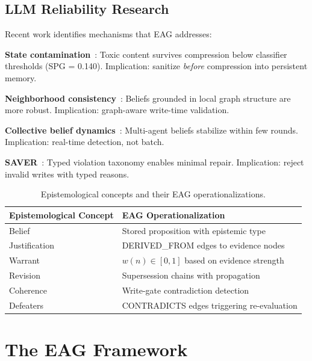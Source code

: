 \documentclass[11pt,a4paper]{article}
\begin{document}
\subsection{LLM Reliability Research}

Recent work identifies mechanisms that EAG addresses:

\textbf{State contamination}~\cite{wang2026contamination}: Toxic content survives compression below classifier thresholds (SPG = 0.140). Implication: sanitize \textit{before} compression into persistent memory.

\textbf{Neighborhood consistency}~\cite{xu2026ncb}: Beliefs grounded in local graph structure are more robust. Implication: graph-aware write-time validation.

\textbf{Collective belief dynamics}~\cite{he2026collective}: Multi-agent beliefs stabilize within few rounds. Implication: real-time detection, not batch.

\textbf{SAVER}~\cite{yuan2026saver}: Typed violation taxonomy enables minimal repair. Implication: reject invalid writes with typed reasons.

\begin{table}[H]
\centering
\caption{Epistemological concepts and their EAG operationalizations.}
\label{tab:concepts}
\begin{tabular}{@{}ll@{}}
\toprule
\textbf{Epistemological Concept} & \textbf{EAG Operationalization} \\
\midrule
Belief & Stored proposition with epistemic type \\
Justification & DERIVED\_FROM edges to evidence nodes \\
Warrant & $w(n) \in [0,1]$ based on evidence strength \\
Revision & Supersession chains with propagation \\
Coherence & Write-gate contradiction detection \\
Defeaters & CONTRADICTS edges triggering re-evaluation \\
\bottomrule
\end{tabular}
\end{table}

\section{The EAG Framework}
\label{sec:eag}
\end{document}
